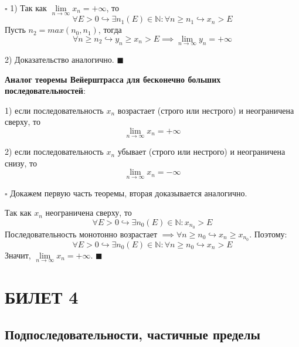\documentclass[12pt, a4paper, reqno]{article}
\begin{document}
    $\square$ 1) Так как $\lim\limits_{n\to\infty} x_n = +\infty$, то
    \begin{equation*}
        \forall E > 0 \hookrightarrow\exists n_1(E)\in\mathbb{N}: \forall n \geq n_1
        \hookrightarrow x_n > E
    \end{equation*}
    Пусть $n_2 = max(n_0, n_1)$, тогда
    \begin{equation*}
        \forall n \geq n_2 \hookrightarrow y_n \geq x_n > E \implies \lim\limits_{n\to\infty} y_n =
        +\infty
    \end{equation*}

    2) Доказательство аналогично. $\blacksquare$

    \textbf{Аналог теоремы Вейерштрасса для бесконечно больших последовательностей}:

    1) если последовательность $x_n$ возрастает (строго или нестрого) и неограничена сверху, то
    \begin{equation*}
        \lim\limits_{n\to\infty} x_n = +\infty
    \end{equation*}

    2) если последовательность $x_n$ убывает (строго или нестрого) и неограничена снизу, то
    \begin{equation*}
        \lim\limits_{n\to\infty} x_n = -\infty
    \end{equation*}

    $\square$ Докажем первую часть теоремы, вторая доказывается аналогично.

    Так как $x_n$ неограничена сверху, то
    \begin{equation*}
        \forall E > 0 \hookrightarrow \exists n_0(E)\in\mathbb{N}: x_{n_0} > E
    \end{equation*}
    Последовательность монотонно возрастает $\implies \forall n \geq n_0 \hookrightarrow x_n\geq
    x_{n_0}$. Поэтому:
    \begin{equation*}
        \forall E > 0 \hookrightarrow \exists n_0(E)\in\mathbb{N}: \forall n \geq n_0
        \hookrightarrow x_n > E
    \end{equation*}
    Значит, $\lim\limits_{n\to\infty} x_n = +\infty$. $\blacksquare$

\newpage
\section{БИЛЕТ 4}

\subsection{Подпоследовательности, частичные пределы}
\end{document}
